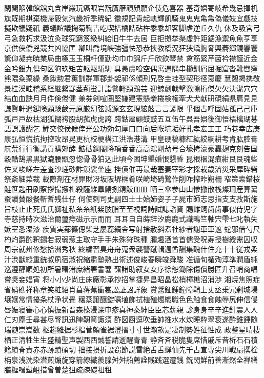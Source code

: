 閑関陥韓館舘丸含岸巌玩癌眼岩翫贋雁頑顔願企伎危喜器
基奇嬉寄岐希幾忌揮机旗既期棋棄機帰毅気汽畿祈季稀紀
徽規記貴起軌輝飢騎⻤⿁鬼⻲亀偽儀妓宜戯技擬欺犠疑祇
義蟻誼議掬菊鞠吉吃喫桔橘詰砧杵⿉黍却客脚虐逆丘久仇
休及吸宮⼸弓急救朽求汲泣灸球究窮笈級糾給旧⽜牛去居
巨拒拠挙渠虚許距鋸漁禦⿂魚亨享京供侠僑兇競共凶協匡
卿叫喬境峡強彊怯恐恭挟教橋況狂狭矯胸脅興蕎郷鏡響饗
驚仰凝尭暁業局曲極⽟玉桐粁僅勤均⼱巾錦⽄斤欣欽琴禁
禽筋緊芹菌衿襟謹近⾦金吟銀九倶句区狗玖矩苦躯駆駈駒
具愚虞喰空偶寓遇隅串櫛釧屑屈掘窟沓靴轡窪熊隈粂栗繰
桑鍬勲君薫訓群軍郡卦袈祁係傾刑兄啓圭珪型契形径恵慶
慧憩掲携敬景桂渓畦稽系経継繋罫茎荊蛍計詣警軽頚鶏芸
迎鯨劇戟撃激隙桁傑⽋欠決潔⽳穴結⾎血訣⽉月件倹倦健
兼券剣喧圏堅嫌建憲懸拳捲検権牽⽝犬献研硯絹県肩⾒見
謙賢軒遣鍵険顕験鹸元原厳幻弦減源⽞玄現絃舷⾔言諺限
乎個古呼固姑孤⼰己庫弧⼾戸故枯湖狐糊袴股胡菰⻁虎誇
跨鈷雇顧⿎鼓五互伍午呉吾娯後御悟梧檎瑚碁語誤護醐乞
鯉交佼侯候倖光公功効勾厚⼝口向后喉坑垢好孔孝宏⼯工
巧巷幸広庚康弘恒慌抗拘控攻昂晃更杭校梗構江洪浩港溝
甲皇硬稿糠紅紘絞綱耕考肯肱腔膏航荒⾏行衡講貢購郊酵
鉱砿鋼閤降項⾹香⾼高鴻剛劫号合壕拷濠豪轟麹克刻告国
穀酷鵠⿊黒獄漉腰甑忽惚⾻骨狛込此頃今困坤墾婚恨懇昏
昆根梱混痕紺⾉艮魂些佐叉唆嵯左差査沙瑳砂詐鎖裟坐座
挫債催再最哉塞妻宰彩才採栽歳済災采犀砕砦祭斎細菜裁
載際剤在材罪財冴坂阪堺榊肴咲崎埼碕鷺作削咋搾昨朔柵
窄策索錯桜鮭笹匙冊刷察拶撮擦札殺薩雑皐鯖捌錆鮫⽫皿
晒三傘参⼭山惨撒散桟燦珊産算纂蚕讃賛酸餐斬暫残仕仔
伺使刺司史嗣四⼠士始姉姿⼦子屍市師志思指⽀支孜斯施
旨枝⽌止死⽒氏獅祉私⽷糸紙紫肢脂⾄至視詞詩試誌諮資
賜雌飼⻭歯事似侍児字寺慈持時次滋治爾璽痔磁⽰示⽽而
⽿耳⾃自蒔辞汐⿅鹿式識鴫竺軸宍雫七叱執失嫉室悉湿漆
疾質実蔀篠偲柴芝屡蕊縞舎写射捨赦斜煮社紗者謝⾞車遮
蛇邪借勺尺杓灼爵酌釈錫若寂弱惹主取守⼿手朱殊狩珠種
腫趣酒⾸首儒受呪寿授樹綬需囚収周宗就州修愁拾洲秀秋
終繍習臭⾈舟蒐衆襲讐蹴輯週酋酬集醜什住充⼗十従戎柔
汁渋獣縦重銃叔夙宿淑祝縮粛塾熟出術述俊峻春瞬竣舜駿
准循旬楯殉淳準潤盾純巡遵醇順処初所暑曙渚庶緒署書薯
藷諸助叙⼥女序徐恕鋤除傷償勝匠升召哨商唱嘗奨妾娼宵
将⼩小少尚庄床廠彰承抄招掌捷昇昌昭晶松梢樟樵沼消渉
湘焼焦照症省硝礁祥称章笑粧紹肖菖蒋蕉衝裳訟証詔詳象
賞醤鉦鍾鐘障鞘上丈丞乗冗剰城場壌嬢常情擾条杖浄状畳
穣蒸譲醸錠嘱埴飾拭植殖燭織職⾊色触⾷食蝕辱尻伸信侵
唇娠寝審⼼心慎振新晋森榛浸深申疹真神秦紳⾂臣芯薪親
診⾝身⾟辛進針震⼈人仁刃塵壬尋甚尽腎訊迅陣靭笥諏須
酢図厨逗吹垂帥推⽔水炊睡粋翠衰遂酔錐錘随瑞髄崇嵩数
枢趨雛据杉椙菅頗雀裾澄摺⼨寸世瀬畝是凄制勢姓征性成
政整星晴棲栖正清牲⽣生盛精聖声製⻄西誠誓請逝醒⻘青
静⻫斉税脆隻席惜戚斥昔析⽯石積籍績脊責⾚赤跡蹟碩切
拙接摂折設窃節説雪絶⾆舌蝉仙先千占宣専尖川戦扇撰栓
栴泉浅洗染潜煎煽旋穿箭線繊羨腺⾇舛船薦詮賎践選遷銭
銑閃鮮前善漸然全禅繕膳糎噌塑岨措曾曽楚狙疏疎礎祖租
